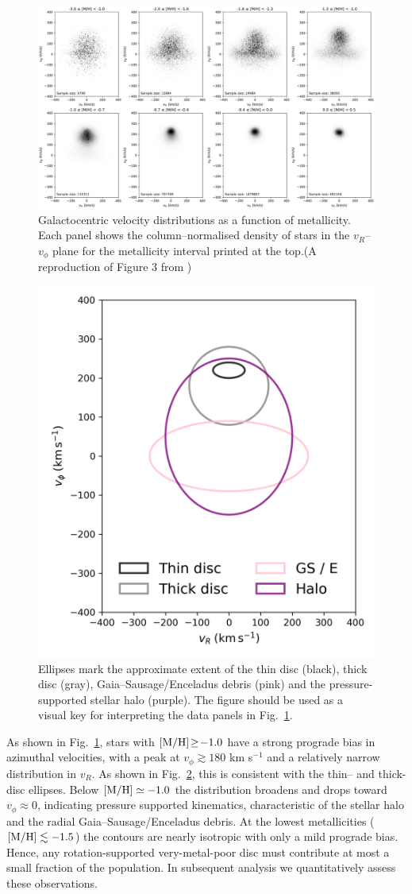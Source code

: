 \documentclass[a4paper,12pt]{article}
\begin{document}
\begin{figure}
  \centering
  \includegraphics[width=\textwidth]
                   {../figures/vphi_metallicity_histograms.png}
  \caption{Galactocentric velocity distributions as a function of metallicity.
           Each panel shows the column–normalised density of stars in the
           $v_R$–$v_\phi$ plane for the metallicity interval printed at the
           top.(A reproduction of Figure 3 from \citet{zhang2024existencemetalpoordiscmilky})
           }
  \label{fig:vRvphi_bins}
\end{figure}


\begin{figure}
  \centering
  \includegraphics[width=0.3\columnwidth]
                   {../figures/reference_velocity_ellipses.png}
  \caption{Ellipses mark the approximate extent of the thin disc
           (black), thick disc (gray),
           Gaia–Sausage/Enceladus debris (pink) and the
           pressure-supported stellar halo (purple).
           The figure should be used as a visual key for interpreting the data panels
           in Fig.~\ref{fig:vRvphi_bins}.
           }
  \label{fig:ref_ellipses}
\end{figure}

As shown in Fig.~\ref{fig:vRvphi_bins}, stars with
${\rm[M/H]}\!\geq\!-1.0$ have a strong prograde bias in azimuthal velocities, 
with a peak at $v_\phi\!\gtrsim\!180$ km s$^{-1}$ and a relatively narrow
distribution in $v_R$. As shown in Fig.~\ref{fig:ref_ellipses}, this is consistent with 
the thin– and thick-disc ellipses. 
Below ${\rm[M/H]}\simeq-1.0$ the distribution broadens and
drops toward $v_\phi\!\approx\!0$, indicating
pressure supported kinematics, characteristic of the stellar halo and
the radial Gaia–Sausage/Enceladus debris.  At the lowest
metallicities (${\rm[M/H]}\lesssim-1.5$) the contours are nearly
isotropic with only a mild prograde bias.  Hence, any
rotation-supported very-metal-poor disc must contribute at most a
small fraction of the population. In subsequent analysis we quantitatively assess
these observations.
\end{document}
